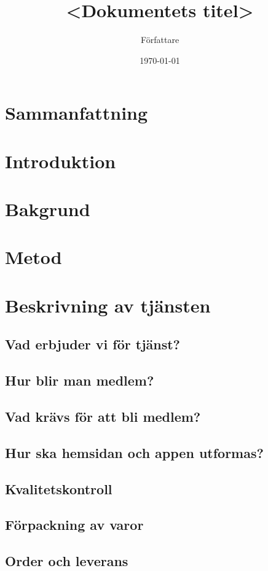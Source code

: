 \documentclass[10pt,a4paper,oneside]{article}
\title{<Dokumentets titel>}
\author{Författare}
\date{\today}
\begin{document}
\maketitle
\newpage

\section{Sammanfattning}
\newpage

\tableofcontents
\newpage

\section{Introduktion}
\newpage

\section{Bakgrund}
\newpage

\section{Metod}
\newpage

\section{Beskrivning av tjänsten}
\subsection{Vad erbjuder vi för tjänst?}
\subsection{Hur blir man medlem?}
\subsection{Vad krävs för att bli medlem?}
\subsection{Hur ska hemsidan och appen utformas?}
\subsection{Kvalitetskontroll}
\subsection{Förpackning av varor}
\subsection{Order och leverans}
\end{document}
